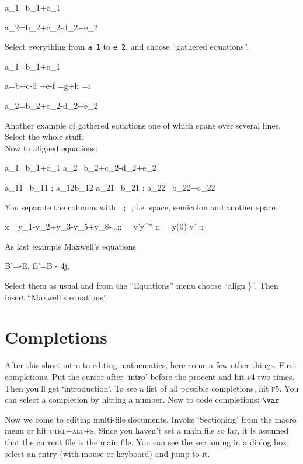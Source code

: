 \documentclass[11pt]{article}
\begin{document}
a_1=b_1+c_1

a_2=b_2+c_2-d_2+e_2

Select everything from \verb>a_1> to \verb<e_2<, and choose ``gathered equations''.

a_1=b_1+c_1

a=b+c-d
\quad +e-f
=g+h
=i

a_2=b_2+c_2-d_2+e_2

Another example of gathered equations one of which spans over several lines. Select the whole stuff.\\

Now to aligned equations:

a_1=b_1+c_1
a_2=b_2+c_2-d_2+e_2


a_{11}=b_{11} ; a_{12}\leq b_{12}
a_{21}=b_{21} ; a_{22}=b_{22}+c_{22}

You separate the columns with \verb*} ; }, i.e. space, semicolon and another space.

x= y_1-y_2+y_3-y_5+y_8-\dots ;; 
= y'\circ y^* ;; 
= y(0) y' ;; 


As last example Maxwell's equations

B'=-\partial\times E,
E'=\partial\times B - 4\pi j,


Select them as usual and from the ``Equations'' menu choose ``align \}''. Then insert ``Maxwell's equations''.\\

\section{Completions}\label{comp}
After this short intro%
to editing mathematics, here come a few other things. First completions. Put the cursor after `intro' before the procent and hit \textsc{f4} two times. Then you'll get `introduction'. To see a list of all possible completions, hit \textsc{f5}. You can select a completion by hitting a number. Now to code completions:
$\var$

Now we come to editing multi-file documents. Invoke `Sectioning' from the macro menu or hit \textsc{ctrl+alt+s}. Since you haven't set a main file so far, it is assumed that the current file is the main file. You can see the sectioning in a dialog box, select an entry (with mouse or keyboard) and jump to it.
\end{document}
